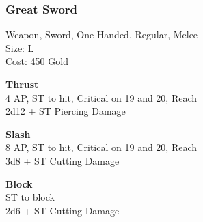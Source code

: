 \subsubsection{Great Sword}\label{weapon:greatSword}
Weapon, Sword, One-Handed, Regular, Melee\\
Size: L\\
Cost: 450 Gold

\textbf{Thrust}\\
4 AP, ST to hit, Critical on 19 and 20,  Reach\\
2d12 + \texttimes ST Piercing Damage

\textbf{Slash}\\
8 AP, ST to hit, Critical on 19 and 20,  Reach\\
3d8 + \texttimes ST Cutting Damage

\textbf{Block}\\
ST to block\\
2d6 + \texttimes ST Cutting Damage